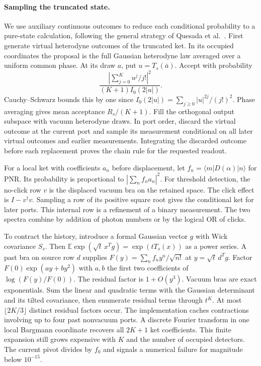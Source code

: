 \documentclass[11pt]{article}
\newcommand{\E}{\mathbb{E}}
\begin{document}
\paragraph{Sampling the truncated state.}
We use auxiliary continuous outcomes to reduce each conditional probability to a pure-state calculation, following the general strategy of Quesada et al.~\cite{auxiliary}. First generate virtual heterodyne outcomes of the truncated ket. In its occupied coordinates the proposal is the full Gaussian heterodyne law averaged over a uniform common phase. At its draw $a$, put $u=T_s(\bar a)$. Accept with probability
\[
  \frac{|\sum_{j=0}^K u^j/j!|^2}{(K+1) I_0(2|u|)} .
\]
Cauchy--Schwarz bounds this by one since $I_0(2|u|)=\sum_{j\ge0}|u|^{2j}/(j!)^2$. Phase averaging gives mean acceptance $R_s/(K+1)$. Fill the orthogonal output subspace with vacuum heterodyne draws. In port order, discard the virtual outcome at the current port and sample its measurement conditional on all later virtual outcomes and earlier measurements. Integrating the discarded outcome before each replacement proves the chain rule for the requested readout.

For a local ket with coefficients $a_n$ before displacement, let $f_n=\langle m|D(\alpha)|n\rangle$ for PNR. Its probability is proportional to $|\sum_n f_na_n|^2$. For threshold detection, the no-click row $v$ is the displaced vacuum bra on the retained space. The click effect is $I-v^\dagger v$. Sampling a row of its positive square root gives the conditional ket for later ports. This internal row is a refinement of a binary measurement. The two spectra combine by addition of photon numbers or by the logical OR of clicks.

To contract the history, introduce a formal Gaussian vector $g$ with Wick covariance $S_s$. Then $\E\exp(\sqrt t\,x^Tg)=\exp(tT_s(x))$ as a power series. A past bra on source row $d$ supplies $F(y)=\sum_n f_n y^n/\sqrt{n!}$ at $y=\sqrt t\,d^Tg$. Factor $F(0)\exp(ay+by^2)$ with $a,b$ the first two coefficients of $\log(F(y)/F(0))$. The residual factor is $1+O(y^3)$. Vacuum bras are exact exponentials. Sum the linear and quadratic terms with the Gaussian determinant and its tilted covariance, then enumerate residual terms through $t^K$. At most $\lfloor 2K/3\rfloor$ distinct residual factors occur. The implementation caches contractions involving up to four past nonvacuum ports. A discrete Fourier transform in one local Bargmann coordinate recovers all $2K+1$ ket coefficients. This finite expansion still grows expensive with $K$ and the number of occupied detectors. The current pivot divides by $f_0$ and signals a numerical failure for magnitude below $10^{-15}$.
\end{document}
